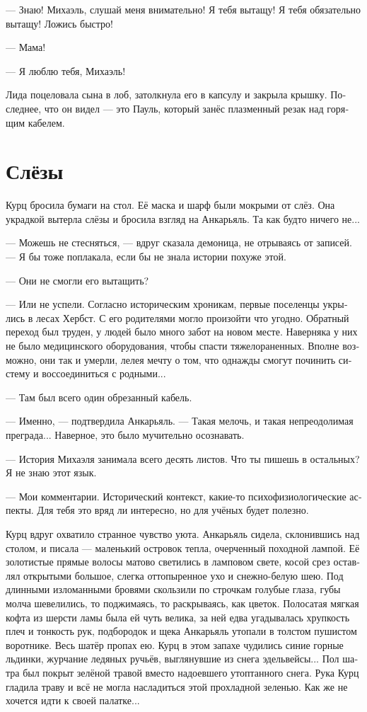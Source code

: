 \documentclass[a4paper,10pt,fleqn]{book}\usepackage{polyglossia}\setdefaultlanguage[babelshorthands=true]{russian}\setotherlanguage{english}\defaultfontfeatures{Ligatures=TeX,Mapping=tex-text}\usepackage{xcolor}\newcommand{\ml}[3]{#2}
\begin{document}
--- Знаю!
Михаэль, слушай меня внимательно!
Я тебя вытащу!
Я тебя обязательно вытащу!
Ложись быстро!

--- Мама!

--- Я люблю тебя, Михаэль!

Лида поцеловала сына в лоб, затолкнула его в капсулу и закрыла крышку.
Последнее, что он видел --- это Пауль, который занёс плазменный резак над горящим кабелем.

\section{Слёзы}

Курц бросила бумаги на стол.
Её маска и шарф были мокрыми от слёз.
Она украдкой вытерла слёзы и бросила взгляд на Анкарьяль.
Та как будто ничего не...

--- Можешь не стесняться, --- вдруг сказала демоница, не отрываясь от записей.
--- Я бы тоже поплакала, если бы не знала истории похуже этой.

--- Они не смогли его вытащить?

--- Или не успели.
Согласно историческим хроникам, первые поселенцы укрылись в лесах Хербст.
С его родителями могло произойти что угодно.
Обратный переход был труден, у людей было много забот на новом месте.
Наверняка у них не было медицинского оборудования, чтобы спасти тяжелораненных.
Вполне возможно, они так и умерли, лелея мечту о том, что однажды смогут починить систему и воссоединиться с родными...

--- Там был всего один обрезанный кабель.

--- Именно, --- подтвердила Анкарьяль.
--- Такая мелочь, и такая непреодолимая преграда...
Наверное, это было мучительно осознавать.

--- История Михаэля занимала всего десять листов.
Что ты пишешь в остальных?
Я не знаю этот язык.

--- Мои комментарии.
Исторический контекст, какие-то психофизиологические аспекты.
Для тебя это вряд ли интересно, но для учёных будет полезно.

Курц вдруг охватило странное чувство уюта.
Анкарьяль сидела, склонившись над столом, и писала --- маленький островок тепла, очерченный походной лампой.
Её золотистые прямые волосы матово светились в ламповом свете, косой срез оставлял открытыми большое, слегка оттопыренное ухо и снежно-белую шею.
Под длинными изломанными  бровями скользили по строчкам голубые глаза, губы молча шевелились, то поджимаясь, то раскрываясь, как цветок.
Полосатая мягкая кофта из шерсти ламы была ей чуть велика, за ней едва угадывалась хрупкость плеч и тонкость рук, подбородок и щека Анкарьяль утопали в толстом пушистом воротнике.
Весь шатёр пропах ею.
Курц в этом запахе чудились синие горные льдинки, журчание ледяных ручьёв, выглянувшие из снега эдельвейсы...
Пол шатра был покрыт зелёной травой вместо надоевшего утоптанного снега.
Рука Курц гладила траву и всё не могла насладиться этой прохладной зеленью.
Как же не хочется идти к своей палатке...
\end{document}
